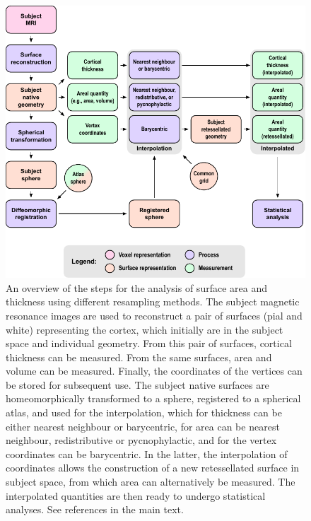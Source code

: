 \begin{figure}[!p]
\begin{center}
\includegraphics[width=\textwidth]{figures/flowchart.pdf}
\caption[Overview of the steps for the analysis of surface area and thickness using different resampling methods.]{An overview of the steps for the analysis of surface area and thickness using different resampling methods. The subject magnetic resonance images are used to reconstruct a pair of surfaces (pial and white) representing the cortex, which initially are in the subject space and individual geometry. From this pair of surfaces, cortical thickness can be measured. From the same surfaces, area and volume can be measured. Finally, the coordinates of the vertices can be stored for subsequent use. The subject native surfaces are homeomorphically transformed to a sphere, registered to a spherical atlas, and used for the interpolation, which for thickness can be either nearest neighbour or barycentric, for area can be nearest neighbour, redistributive or pycnophylactic, and for the vertex coordinates can be barycentric. In the latter, the interpolation of coordinates allows the construction of a new retessellated surface in subject space, from which area can alternatively be measured. The interpolated quantities are then ready to undergo statistical analyses. See references in the main text.}
\label{fig:flowchart}
\end{center}
\end{figure}

